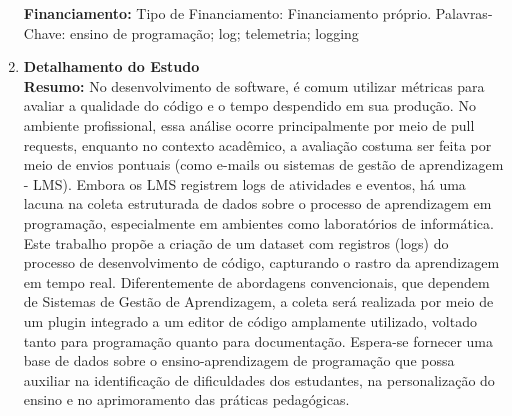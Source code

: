 \documentclass[10pt,a4paper]{article}
\begin{document}
\begin{enumerate}
\textbf{Financiamento:}
Tipo de Financiamento: Financiamento próprio.
Palavras- Chave: ensino de programação; log; telemetria; logging\\
\item \textbf{Detalhamento do Estudo} \\
\noindent \textbf{Resumo:}
No desenvolvimento de software, é comum utilizar métricas para avaliar a qualidade do código e o tempo despendido em sua produção. No ambiente profissional, essa análise ocorre principalmente por meio de pull requests, enquanto no contexto acadêmico, a avaliação costuma ser feita por meio de envios pontuais (como e-mails ou sistemas de gestão de aprendizagem - LMS). Embora os LMS registrem logs de atividades e eventos, há uma lacuna na coleta estruturada de dados sobre o processo de aprendizagem em programação, especialmente em
ambientes como laboratórios de informática. Este trabalho propõe a criação de um dataset com registros (logs) do processo de desenvolvimento de código, capturando o rastro da aprendizagem em tempo real. Diferentemente de abordagens convencionais, que dependem de Sistemas de Gestão de Aprendizagem, a coleta será realizada por meio de um plugin integrado a um editor de código amplamente utilizado, voltado tanto para programação quanto para documentação. Espera-se fornecer uma base de dados sobre o ensino-aprendizagem de programação que possa auxiliar na identificação de dificuldades dos estudantes, na personalização do ensino e no aprimoramento das práticas pedagógicas.

\end{enumerate}
\end{document}
